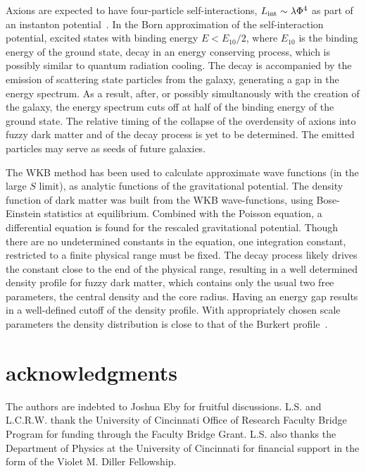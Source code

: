 \documentclass[aps,prl,twocolumn]{revtex4}
\begin{document}
Axions are expected to have four-particle self-interactions, $L_{\rm int}\sim \lambda \Phi^4$ as part of an instanton potential~\cite{Hui}. In the Born approximation of the self-interaction potential, excited states with binding energy $E< E_{10}/2$, where $E_{10}$ is the binding energy of the ground state, decay in an energy conserving process, which is possibly similar to quantum radiation cooling. The decay is accompanied by the emission of scattering state particles from the galaxy, generating a gap in the energy spectrum. As a result, after, or possibly simultanously with the creation of the galaxy, the energy spectrum cuts off at half of the binding energy of the ground state. The relative timing of the collapse of the overdensity of axions into fuzzy dark matter and of the decay process is yet to be determined. The emitted particles may serve as seeds of future galaxies. 

The WKB method has been used to calculate approximate wave functions (in the large $S$ limit), as analytic functions of the gravitational potential.  The density function of dark matter was built from the WKB wave-functions, using Bose-Einstein statistics at equilibrium. Combined with the Poisson equation, a differential equation is found for the rescaled gravitational potential. Though there are no undetermined constants in the equation, one integration constant, restricted to a finite physical range must be fixed.  The decay process likely drives the constant close to the end of the physical range, resulting in a well determined density profile for fuzzy dark matter, which contains only the usual two free parameters, the central density and the core radius.  Having an energy gap results in a well-defined cutoff of the density profile.  With appropriately chosen scale parameters the density distribution is close to that of the Burkert profile~\cite{Burkert}.




\section{acknowledgments}
The authors are indebted to Joshua Eby for fruitful discussions.  L.S. and L.C.R.W. thank the University of Cincinnati Office of Research Faculty Bridge Program for funding through the Faculty Bridge Grant.  L.S. also thanks the Department of Physics at the University of Cincinnati for financial support in the form of the Violet M. Diller Fellowship.
\end{document}
